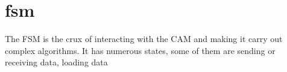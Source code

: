 \section{fsm}
The FSM is the crux of interacting with the CAM and making it carry out complex algorithms. It has numerous states, some of them are sending or receiving data, loading data